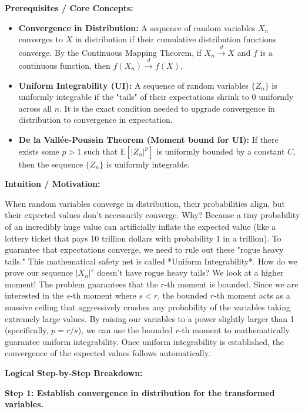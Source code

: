 \begin{solution}
\textbf{Prerequisites / Core Concepts:}
\begin{itemize}
    \item \textbf{Convergence in Distribution:} A sequence of random variables $X_n$ converges to $X$ in distribution if their cumulative distribution functions converge. By the Continuous Mapping Theorem, if $X_n \xrightarrow{d} X$ and $f$ is a continuous function, then $f(X_n) \xrightarrow{d} f(X)$.
    \item \textbf{Uniform Integrability (UI):} A sequence of random variables $\{Z_n\}$ is uniformly integrable if the "tails" of their expectations shrink to 0 uniformly across all $n$. It is the exact condition needed to upgrade convergence in distribution to convergence in expectation.
    \item \textbf{De la Vallée-Poussin Theorem (Moment bound for UI):} If there exists some $p > 1$ such that $\mathbb{E}[|Z_n|^p]$ is uniformly bounded by a constant $C$, then the sequence $\{Z_n\}$ is uniformly integrable.
\end{itemize}

\textbf{Intuition / Motivation:}

When random variables converge in distribution, their probabilities align, but their expected values don't necessarily converge. Why? Because a tiny probability of an incredibly huge value can artificially inflate the expected value (like a lottery ticket that pays 10 trillion dollars with probability 1 in a trillion).
To guarantee that expectations converge, we need to rule out these "rogue heavy tails." This mathematical safety net is called *Uniform Integrability*.
How do we prove our sequence $|X_n|^s$ doesn't have rogue heavy tails? We look at a higher moment! The problem guarantees that the $r$-th moment is bounded. Since we are interested in the $s$-th moment where $s < r$, the bounded $r$-th moment acts as a massive ceiling that aggressively crushes any probability of the variables taking extremely large values.
By raising our variables to a power slightly larger than 1 (specifically, $p = r/s$), we can use the bounded $r$-th moment to mathematically guarantee uniform integrability. Once uniform integrability is established, the convergence of the expected values follows automatically.

\textbf{Logical Step-by-Step Breakdown:}

\textbf{Step 1: Establish convergence in distribution for the transformed variables.}


\end{solution}
